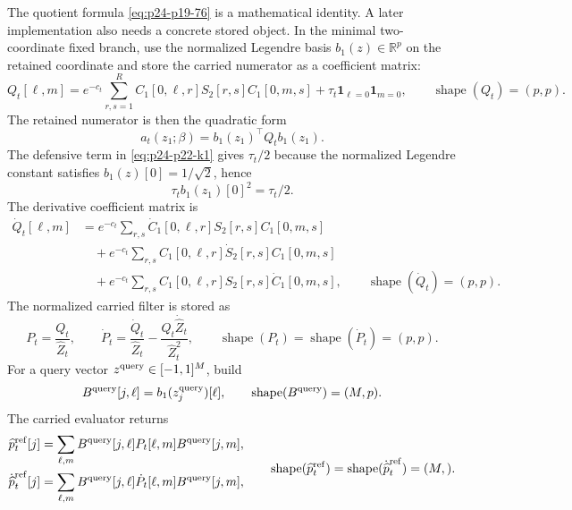 \documentclass[11pt]{article}
\numberwithin{equation}{section}
\newcommand{\R}{\mathbb R}
\newcommand{\ind}{\mathbf 1}
\newcommand{\shape}{\operatorname{shape}}
\begin{document}
The quotient formula \eqref{eq:p24-p19-76} is a mathematical identity.  A later implementation
also needs a concrete stored object.  In the minimal two-coordinate fixed
branch, use the normalized Legendre basis \(b_1(z)\in\R^p\) on the retained
coordinate and store the carried numerator as a coefficient matrix:
\begin{equation}
    Q_t[\ell,m]
    =
    e^{-c_t}\sum_{r,s=1}^{R}
    C_1[0,\ell,r]S_2[r,s]C_1[0,m,s]
    +\tau_t\ind_{\ell=0}\ind_{m=0},
    \qquad
    \shape(Q_t)=(p,p).
    \label{eq:p24-p22-k1}
\end{equation}
The retained numerator is then the quadratic form
\begin{equation}
    a_t(z_1;\beta)=b_1(z_1)^\top Q_t b_1(z_1).
    \label{eq:p24-p22-k2}
\end{equation}
The defensive term in \eqref{eq:p24-p22-k1} gives \(\tau_t/2\) because the normalized Legendre
constant satisfies \(b_1(z)[0]=1/\sqrt2\), hence
\begin{equation}
    \tau_t b_1(z_1)[0]^2=\tau_t/2.
    \label{eq:p24-p22-k3}
\end{equation}
The derivative coefficient matrix is
\begin{equation}
\begin{aligned}
    \dot Q_t[\ell,m]
    &=
    e^{-c_t}\sum_{r,s}
    \dot C_1[0,\ell,r]S_2[r,s]C_1[0,m,s]\\
    &\quad+
    e^{-c_t}\sum_{r,s}
    C_1[0,\ell,r]\dot S_2[r,s]C_1[0,m,s]\\
    &\quad+
    e^{-c_t}\sum_{r,s}
    C_1[0,\ell,r]S_2[r,s]\dot C_1[0,m,s],
    \qquad
    \shape(\dot Q_t)=(p,p).
\end{aligned}
\label{eq:p24-p22-k4}
\end{equation}
The normalized carried filter is stored as
\begin{equation}
    P_t=\frac{Q_t}{\widehat Z_t},
    \qquad
    \dot P_t=
    \frac{\dot Q_t}{\widehat Z_t}
    -
    \frac{Q_t\dot{\widehat Z}_t}{\widehat Z_t^2},
    \qquad
    \shape(P_t)=\shape(\dot P_t)=(p,p).
    \label{eq:p24-p22-k5}
\end{equation}
For a query vector \(z^{\rm query}\in[-1,1]^M\), build
\begin{equation}
    B^{\rm query}[j,\ell]=b_1(z^{\rm query}_j)[\ell],
    \qquad
    \shape(B^{\rm query})=(M,p).
    \label{eq:p24-p22-k6}
\end{equation}
The carried evaluator returns
\begin{equation}
\begin{aligned}
    \widehat p_t^{\rm ref}[j]
    &=
    \sum_{\ell,m}
    B^{\rm query}[j,\ell]P_t[\ell,m]B^{\rm query}[j,m],\\
    \dot{\widehat p}_t^{\rm ref}[j]
    &=
    \sum_{\ell,m}
    B^{\rm query}[j,\ell]\dot P_t[\ell,m]B^{\rm query}[j,m],
\end{aligned}
\qquad
\shape(\widehat p_t^{\rm ref})
=
\shape(\dot{\widehat p}_t^{\rm ref})
=(M,).
\label{eq:p24-p22-k7}
\end{equation}
\end{document}
